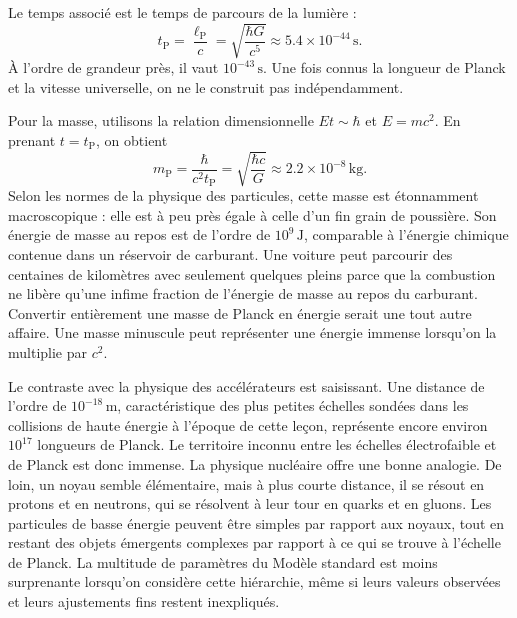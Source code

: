 Le temps associé est le temps de parcours de la lumière :
\begin{equation}
t_{\mathrm P}
=\frac{\ell_{\mathrm P}}{c}
=\sqrt{\frac{\hbar G}{c^5}}
\approx 5.4\times10^{-44}\,\mathrm s.
\label{eq:c10-planck-time}
\end{equation}
À l’ordre de grandeur près, il vaut \(10^{-43}\,\mathrm s\). Une fois connus la longueur de Planck et la vitesse universelle, on ne le construit pas indépendamment.

Pour la masse, utilisons la relation dimensionnelle \(Et\sim\hbar\) et \(E=mc^2\). En prenant \(t=t_{\mathrm P}\), on obtient
\begin{equation}
m_{\mathrm P}
=\frac{\hbar}{c^2t_{\mathrm P}}
=\sqrt{\frac{\hbar c}{G}}
\approx 2.2\times10^{-8}\,\mathrm{kg}.
\label{eq:c10-planck-mass}
\end{equation}
Selon les normes de la physique des particules, cette masse est étonnamment macroscopique : elle est à peu près égale à celle d’un fin grain de poussière. Son énergie de masse au repos est de l’ordre de \(10^9\,\mathrm J\), comparable à l’énergie chimique contenue dans un réservoir de carburant. Une voiture peut parcourir des centaines de kilomètres avec seulement quelques pleins parce que la combustion ne libère qu’une infime fraction de l’énergie de masse au repos du carburant. Convertir entièrement une masse de Planck en énergie serait une tout autre affaire. Une masse minuscule peut représenter une énergie immense lorsqu’on la multiplie par \(c^2\).

Le contraste avec la physique des accélérateurs est saisissant. Une distance de l’ordre de \(10^{-18}\,\mathrm m\), caractéristique des plus petites échelles sondées dans les collisions de haute énergie à l’époque de cette leçon, représente encore environ \(10^{17}\) longueurs de Planck. Le territoire inconnu entre les échelles électrofaible et de Planck est donc immense. La physique nucléaire offre une bonne analogie. De loin, un noyau semble élémentaire, mais à plus courte distance, il se résout en protons et en neutrons, qui se résolvent à leur tour en quarks et en gluons. Les particules de basse énergie peuvent être simples par rapport aux noyaux, tout en restant des objets émergents complexes par rapport à ce qui se trouve à l’échelle de Planck. La multitude de paramètres du Modèle standard est moins surprenante lorsqu’on considère cette hiérarchie, même si leurs valeurs observées et leurs ajustements fins restent inexpliqués.

